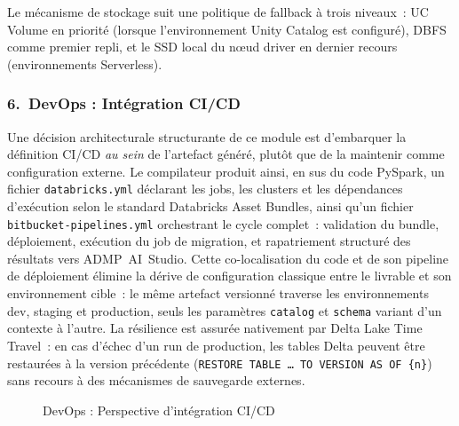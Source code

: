 Le mécanisme de stockage suit une politique de fallback à trois niveaux~: UC Volume en priorité (lorsque l'environnement Unity Catalog est configuré), DBFS comme premier repli, et le SSD local du nœud driver en dernier recours (environnements Serverless).

\subsubsection*{6.\ DevOps : Intégration CI/CD}

Une décision architecturale structurante de ce module est d'embarquer la définition CI/CD \emph{au sein} de l'artefact généré, plutôt que de la maintenir comme configuration externe. Le compilateur produit ainsi, en sus du code PySpark, un fichier \texttt{databricks.yml} déclarant les jobs, les clusters et les dépendances d'exécution selon le standard Databricks Asset Bundles, ainsi qu'un fichier \texttt{bitbucket-pipelines.yml} orchestrant le cycle complet~: validation du bundle, déploiement, exécution du job de migration, et rapatriement structuré des résultats vers ADMP~AI~Studio. Cette co-localisation du code et de son pipeline de déploiement élimine la dérive de configuration classique entre le livrable et son environnement cible~: le même artefact versionné traverse les environnements dev, staging et production, seuls les paramètres \texttt{catalog} et \texttt{schema} variant d'un contexte à l'autre. La résilience est assurée nativement par Delta Lake Time Travel~: en cas d'échec d'un run de production, les tables Delta peuvent être restaurées à la version précédente (\texttt{RESTORE TABLE~\ldots~TO VERSION AS OF \{n\}}) sans recours à des mécanismes de sauvegarde externes.

\iffalse
\begin{figure}[H]
\centering
{}
\caption{DevOps : Perspective d'intégration CI/CD}
\label{fig:archi-devops}
\end{figure}

